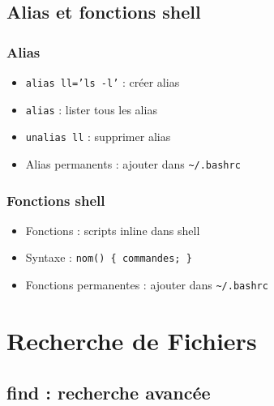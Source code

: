 \documentclass[12pt,a4paper]{article}
\begin{document}
\subsection{Alias et fonctions shell}

\subsubsection{Alias}
\begin{itemize}
    \item \texttt{alias ll='ls -l'} : cr\'eer alias %
    \item \texttt{alias} : lister tous les alias %
    \item \texttt{unalias ll} : supprimer alias %
    \item Alias permanents : ajouter dans \texttt{\textasciitilde/.bashrc} %
\end{itemize}

\subsubsection{Fonctions shell}
\begin{itemize}
    \item Fonctions : scripts inline dans shell %
    \item Syntaxe : \texttt{nom() \{ commandes; \}} %
    \item Fonctions permanentes : ajouter dans \texttt{\textasciitilde/.bashrc} %
\end{itemize}


\section{Recherche de Fichiers}


\subsection{find : recherche avanc\'ee}
\end{document}
